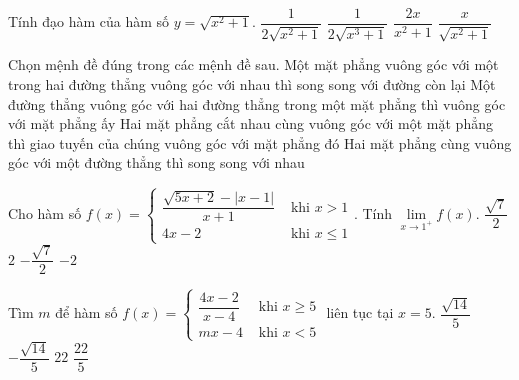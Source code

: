 \begin{ex}%
	Tính đạo hàm của hàm số $y=\sqrt{x^2+1}.$
	\choice
	{$\dfrac{1}{2\sqrt{x^2+1}}$}
	{$\dfrac{1}{2\sqrt{x^3+1}}$}
	{$\dfrac{2x}{x^2+1}$}
	{\True $\dfrac{x}{\sqrt{x^2+1}}$}
\end{ex}

\begin{ex}%
	Chọn mệnh đề đúng trong các mệnh đề sau.
	\choice
	{Một mặt phẳng vuông góc với một trong hai đường thẳng vuông góc với nhau thì song song với đường còn lại}
	{Một đường thẳng vuông góc với hai đường thẳng trong một mặt phẳng thì vuông góc với mặt phẳng ấy}
	{\True Hai mặt phẳng cắt nhau cùng vuông góc với một mặt phẳng thì giao tuyến của chúng vuông góc với mặt phẳng đó}
	{Hai mặt phẳng cùng vuông góc với một đường thẳng thì song song với nhau}
	\loigiai{
		
	}
\end{ex} 

\begin{ex}%
	Cho hàm số $f(x)=\begin{cases}
	\dfrac{\sqrt{5x+2}-|x-1|}{x+1} &\text{ khi } x>1\\
	4x-2 &\text{ khi } x \leq 1
	\end{cases}.$ Tính $\lim\limits_{x \rightarrow 1^{+}}f(x).$
	\choice
	{\True $\dfrac{\sqrt{7}}{2}$}
	{$2$}
	{$-\dfrac{\sqrt{7}}{2}$}
	{$-2$}
\end{ex}

\begin{ex}%
	Tìm $m$ để hàm số $f(x)=\begin{cases}
	\dfrac{4x-2}{x-4} &\text{ khi } x \geq 5 \\
	mx-4 &\text{ khi } x<5
	\end{cases}$ liên tục tại $x=5.$
	\choice
	{$\dfrac{\sqrt{14}}{5}$}
	{$-\dfrac{\sqrt{14}}{5}$}
	{$22$}
	{\True $\dfrac{22}{5}$}
\end{ex}


